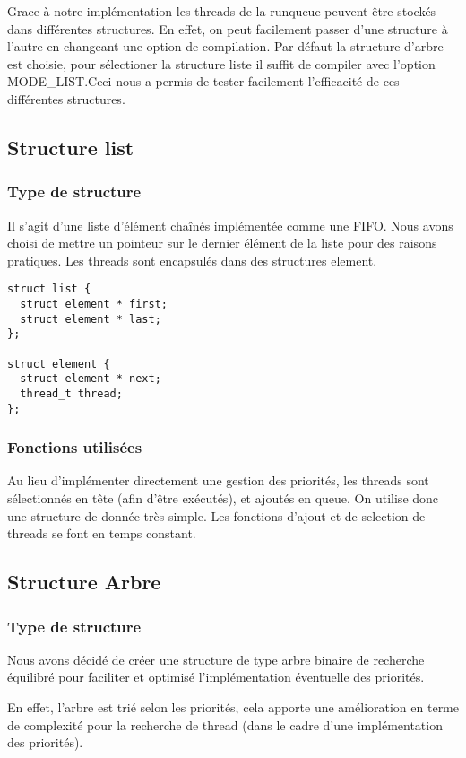 
Grace à notre implémentation les threads de la runqueue peuvent être
stockés dans différentes structures. En effet, on peut facilement
passer d'une structure à l'autre en changeant une option de
compilation. Par défaut la structure d'arbre est choisie, pour
sélectioner la structure liste il suffit de compiler avec l'option
MODE\_LIST.Ceci nous a permis de tester facilement l'efficacité de ces
différentes structures.

\subsection{Structure list}
\subsubsection{Type de structure}
Il s'agit d'une liste d'élément chaînés implémentée comme une
FIFO. Nous avons choisi de mettre un pointeur sur le dernier élément
de la liste pour des raisons pratiques. Les threads sont encapsulés
dans des structures element.
\begin{verbatim}
struct list {
  struct element * first;
  struct element * last;
};

struct element {
  struct element * next;
  thread_t thread;
};

\end{verbatim}


\subsubsection{Fonctions utilisées}
Au lieu d'implémenter directement une gestion des priorités, les
threads sont sélectionnés en tête (afin d'être exécutés), et ajoutés
en queue. On utilise donc une structure de donnée très simple.  Les
fonctions d'ajout et de selection de threads se font en temps
constant.

\subsection{Structure Arbre}
\subsubsection{Type de structure}
Nous avons décidé de créer une structure de type arbre binaire de
recherche équilibré pour faciliter et optimisé l'implémentation
éventuelle des priorités.

En effet, l'arbre est trié selon les priorités, cela apporte une
amélioration en terme de complexité pour la recherche de thread (dans
le cadre d'une implémentation des priorités).

